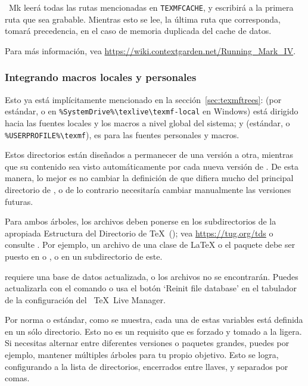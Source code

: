 \documentclass{article}
\begin{document}
\ConTeXt\ Mk leerá todas las rutas mencionadas en
\verb+TEXMFCACHE+, y escribirá a la primera ruta que sea grabable.
Mientras esto se lee, la última ruta que corresponda, tomará precedencia,
en el caso de memoria duplicada del cache de datos. 

Para más información, vea 
\url{https://wiki.contextgarden.net/Running_Mark_IV}.

\subsubsection{Integrando macros locales y personales}
\label{sec:local-personal-macros}

Esto ya está implícitamente mencionado en la
sección~\ref{sec:texmftrees}: 
 (por estándar,
 o en
\verb|%SystemDrive%\texlive\texmf-local| en Windows)
está dirigido hacia las fuentes locales y los macros a nivel global
del sistema; y  (estándar,  o
\verb|%USERPROFILE%\texmf|), es para las fuentes personales y macros.

Estos directorios están diseñados a permanecer de una versión a otra,
mientras que su contenido sea visto automáticamente por cada nueva
versión de \TL{}. De esta manera, lo mejor es no cambiar la definición
de  que difiera mucho del principal directorio de
\TL{}, o de lo contrario necesitaría cambiar manualmente las versiones
futuras. 


Para ambos árboles, los archivos deben ponerse en los subdirectorios
de la apropiada Estructura del Directorio de \TeX\ (\TDS); vea
\url{https://tug.org/tds} o consulte
. Por ejemplo, un archivo de una
clase de \LaTeX{}
o 
el paquete debe ser puesto en  o
, o en un subdirectorio de este.

 requiere una base de datos actualizada, o los
archivos no se encontrarán. Puedes actualizarla con el comando
 o usa el botón `Reinit file database' en el
tabulador de la configuración del \GUI\ \TeX\ Live Manager. 

Por norma o estándar, como se muestra, cada una de estas variables está
definida en un sólo directorio. Esto no es
un requisito que es forzado y tomado a la ligera. Si necesitas alternar entre
diferentes versiones o paquetes grandes, puedes por ejemplo, 
mantener múltiples árboles para tu propio
objetivo. Esto se logra, configurando  a la lista de directorios, 
encerrados entre llaves, y separados por comas.
\end{document}
